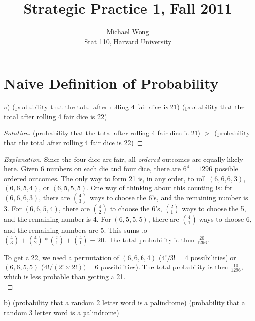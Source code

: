 \documentclass[10pt]{article}
\newenvironment{problem}[2][Problem]{\begin{trivlist}
\item[\hskip \labelsep {\bfseries #1}\hskip \labelsep {\bfseries #2.}]}{\end{trivlist}}
\begin{document}
 
\title{Strategic Practice 1, Fall 2011}
\author{Michael Wong\\
Stat 110, Harvard University}
\maketitle

\section{Naive Definition of Probability}
 
\begin{problem}{1} 
(a) (probability that the total after rolling 4 fair dice is 21) \underline{\hspace{1cm}}
(probability that the total after rolling 4 fair dice is 22)
\end{problem}

\begin{proof}[Solution]

(probability that the total after rolling 4 fair dice is 21) $>$
(probability that the total after rolling 4 fair dice is 22)
\end{proof}

\begin{proof}[Explanation]

Since the four dice are fair, all \textit{ordered} outcomes are equally likely here. Given 6 numbers on each die and four dice, there are $6^4 = 1296$ possible ordered outcomes. The only way to form 21 is, in any order, to roll $(6, 6, 6, 3)$, $(6, 6, 5, 4)$, or $(6, 5, 5, 5)$. One way of thinking about this counting is: for $(6, 6, 6, 3)$, there are \(\binom{4}{3}\) ways to choose the 6's, and the remaining number is 3. For $(6, 6, 5, 4)$, there are \(\binom{4}{2}\) to choose the 6's, \(\binom{2}{1}\) ways to choose the 5, and the remaining number is 4. For $(6, 5, 5, 5)$, there are \(\binom{4}{1}\) ways to choose 6, and the remaining numbers are 5. This sums to \(\binom{4}{3} + \binom{4}{2} * \binom{2}{1} + \binom{4}{1} = 20.\) The total probability is then \(\frac{20}{1296}\).  

To get a 22, we need a permutation of $(6, 6, 6, 4)$ ($4! / 3! = 4$ possibilities) or $(6, 6, 5, 5)$ ($4! / (2! \times 2!)) = 6$ possibilities). The total probability is then \(\frac{10}{1296}\), which is less probable than getting a 21. \\
\end{proof}

\begin{problem}{1} 
(b) (probability that a random 2 letter word is a palindrome) \underline{\hspace{1cm}}
(probability that a random 3 letter word is a palindrome)
\end{problem}
\end{document}
